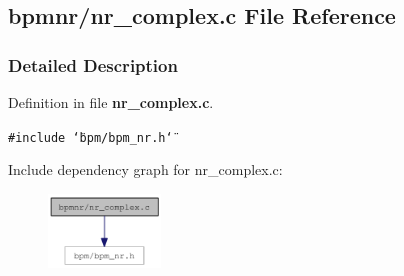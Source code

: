 \subsection{bpmnr/nr\_\-complex.c File Reference}
\label{nr__complex_8c}


\subsubsection{Detailed Description}


Definition in file {\bf nr\_\-complex.c}.

{\tt \#include \char`\"{}bpm/bpm\_\-nr.h\char`\"{}}\par


Include dependency graph for nr\_\-complex.c:\nopagebreak
\begin{figure}[H]
\begin{center}
\leavevmode
\includegraphics[width=85pt]{nr__complex_8c__incl}
\end{center}
\end{figure}
